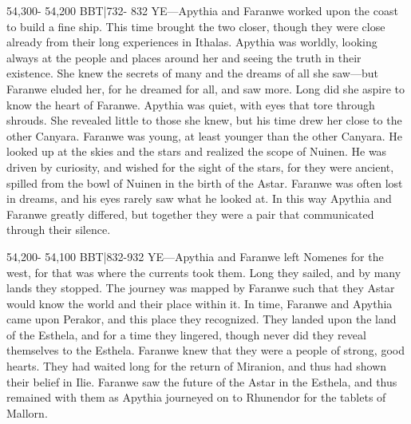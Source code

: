 \documentclass[smalldemyvopaper,11pt,twoside,onecolumn,openright,extrafontsizes]{memoir}
\begin{document}
54,300- 54,200 BBT|732- 832 YE—Apythia and Faranwe worked upon the coast to build a fine ship. This time brought the two closer, though they were close already from their long experiences in Ithalas. Apythia was worldly, looking always at the people and places around her and seeing the truth in their existence. She knew the secrets of many and the dreams of all she saw—but Faranwe eluded her, for he dreamed for all, and saw more. Long did she aspire to know the heart of Faranwe. Apythia was quiet, with eyes that tore through shrouds. She revealed little to those she knew, but his time drew her close to the other Canyara. Faranwe was young, at least younger than the other Canyara. He looked up at the skies and the stars and realized the scope of Nuinen. He was driven by curiosity, and wished for the sight of the stars, for they were ancient, spilled from the bowl of Nuinen in the birth of the Astar. Faranwe was often lost in dreams, and his eyes rarely saw what he looked at. In this way Apythia and Faranwe greatly differed, but together they were a pair that communicated through their silence.

54,200- 54,100 BBT|832-932 YE—Apythia and Faranwe left Nomenes for the west, for that was where the currents took them. Long they sailed, and by many lands they stopped. The journey was mapped by Faranwe such that they Astar would know the world and their place within it. In time, Faranwe and Apythia came upon Perakor, and this place they recognized. They landed upon the land of the Esthela, and for a time they lingered, though never did they reveal themselves to the Esthela. Faranwe knew that they were a people of strong, good hearts. They had waited long for the return of Miranion, and thus had shown their belief in Ilie. Faranwe saw the future of the Astar in the Esthela, and thus remained with them as Apythia journeyed on to Rhunendor for the tablets of Mallorn.
\end{document}
